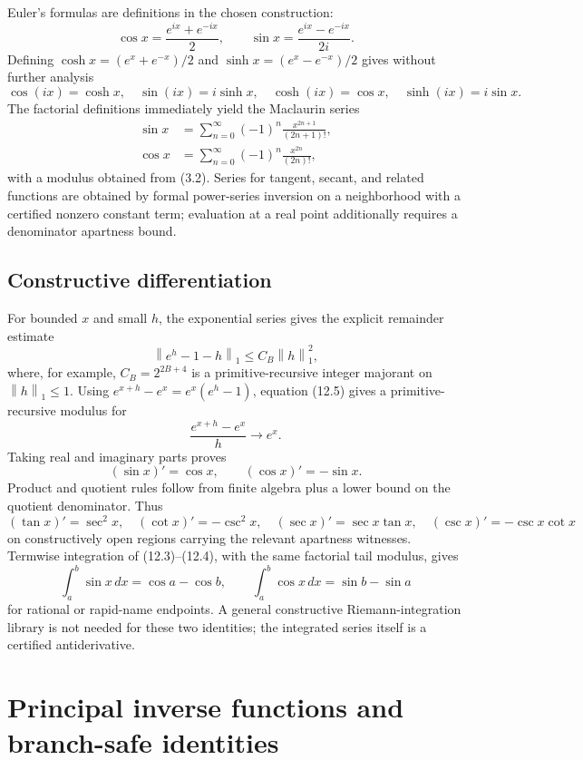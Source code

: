 \documentclass[11pt]{article}
\theoremstyle{definition}
\newcommand{\norm}[1]{\left\lVert#1\right\rVert}
\begin{document}
Euler's formulas are definitions in the chosen construction:
\[
 \cos x=\frac{e^{ix}+e^{-ix}}2,
 \qquad
 \sin x=\frac{e^{ix}-e^{-ix}}{2i}.
 \tag{12.1}
\]
Defining
\(\cosh x=(e^x+e^{-x})/2\) and
\(\sinh x=(e^x-e^{-x})/2\) gives without further analysis
\[
 \cos(ix)=\cosh x,
 \quad \sin(ix)=i\sinh x,
 \quad \cosh(ix)=\cos x,
 \quad \sinh(ix)=i\sin x.
 \tag{12.2}
\]
The factorial definitions immediately yield the Maclaurin series
\begin{align}
 \sin x&=\sum_{n=0}^\infty(-1)^n\frac{x^{2n+1}}{(2n+1)!},\tag{12.3}\\
 \cos x&=\sum_{n=0}^\infty(-1)^n\frac{x^{2n}}{(2n)!},\tag{12.4}
\end{align}
with a modulus obtained from (3.2).  Series for tangent, secant, and related
functions are obtained by formal power-series inversion on a neighborhood with
a certified nonzero constant term; evaluation at a real point additionally
requires a denominator apartness bound.

\subsection{Constructive differentiation}

For bounded \(x\) and small \(h\), the exponential series gives the explicit
remainder estimate
\[
 \norm{e^h-1-h}_1\le C_B\norm h_1^2,
 \tag{12.5}
\]
where, for example, \(C_B=2^{2B+4}\) is a primitive-recursive integer
majorant on \(\norm h_1\le1\).  Using
\(e^{x+h}-e^x=e^x(e^h-1)\), equation (12.5) gives a primitive-recursive
modulus for
\[
 \frac{e^{x+h}-e^x}{h}\longrightarrow e^x.
 \tag{12.6}
\]
Taking real and imaginary parts proves
\[
 (\sin x)'=\cos x,
 \qquad (\cos x)'=-\sin x.
 \tag{12.7}
\]
Product and quotient rules follow from finite algebra plus a lower bound on the
quotient denominator.  Thus
\[
 (\tan x)'=\sec^2x,
 \quad (\cot x)'=-\csc^2x,
 \quad (\sec x)'=\sec x\tan x,
 \quad (\csc x)'=-\csc x\cot x
 \tag{12.8}
\]
on constructively open regions carrying the relevant apartness witnesses.
Termwise integration of (12.3)--(12.4), with the same factorial tail modulus,
gives
\[
 \int_a^b\sin x\,dx=\cos a-\cos b,
 \qquad
 \int_a^b\cos x\,dx=\sin b-\sin a
 \tag{12.9}
\]
for rational or rapid-name endpoints.  A general constructive Riemann-integration
library is not needed for these two identities; the integrated series itself is
a certified antiderivative.

\section{Principal inverse functions and branch-safe identities}
\label{sec:inverse}
\end{document}
